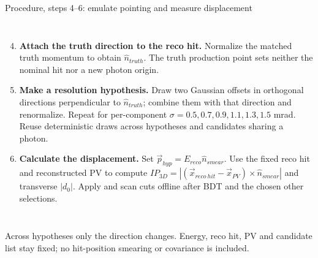 \documentclass[aspectratio=169,10pt]{beamer}
\begin{document}
\begin{frame}{Procedure, steps 4--6: emulate pointing and measure displacement}
\begin{columns}[T,onlytextwidth]
\footnotesize
\begin{enumerate}
\setcounter{enumi}{3}
\item \textbf{Attach the truth direction to the reco hit.} Normalize the matched truth momentum to obtain $\hat n_{truth}$. The truth production point sets neither the nominal hit nor a new photon origin.
\item \textbf{Make a resolution hypothesis.} Draw two Gaussian offsets in orthogonal directions perpendicular to $\hat n_{truth}$; combine them with that direction and renormalize. Repeat for per-component $\sigma=0.5,0.7,0.9,1.1,1.3,1.5$ mrad. Reuse deterministic draws across hypotheses and candidates sharing a photon.
\item \textbf{Calculate the displacement.} Set $\vec p_{hyp}=E_{reco}\hat n_{smear}$. Use the fixed reco hit and reconstructed PV to compute $IP_{3D}=|(\vec x_{reco\ hit}-\vec x_{PV})\times\hat n_{smear}|$ and transverse $|d_0|$. Apply and scan cuts offline after BDT and the chosen other selections.
\end{enumerate}
\centering
{}
\end{columns}
\vspace{0.08cm}
\centering\scriptsize Across hypotheses only the direction changes. Energy, reco hit, PV and candidate list stay fixed; no hit-position smearing or covariance is included.
\end{frame}
\end{document}
